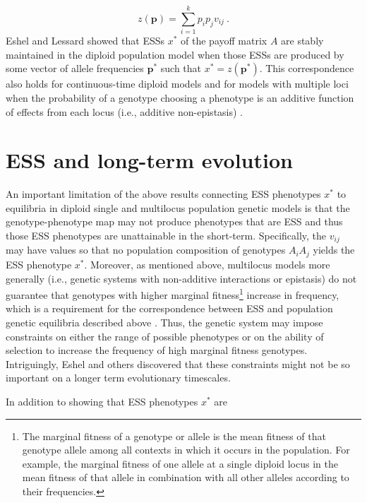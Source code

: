 \documentclass[11pt]{article}
\newcommand{\ess}[1]{#1^*}
\renewcommand{\vec}[1]{\mathbf{#1}}
\begin{document}
\begin{equation*}
  z(\vec{p}) = \sum_{i=1}^{k} p_{i} p_{j} v_{ij} \: .
\end{equation*}
Eshel and Lessard showed \cite{Eshel:1982,Lessard:1984} that ESSs $\ess{x}$ of the payoff matrix $A$ are stably maintained in the diploid population model when those ESSs are produced by some vector of allele frequencies $\ess{\vec{p}}$ such that $\ess{x} = z(\ess{\vec{p}})$. This correspondence also holds for continuous-time diploid models \cite{Sigmund:1987,Cressman:1988,Cressman:Hofbauer:1996,Hofbauer:Sigmund:1998} and for models with multiple loci when the probability of a genotype choosing a phenotype is an additive function of effects from each locus (i.e., additive non-epistasis) \cite{Eshel:1982}.

\section{ESS and long-term evolution}

An important limitation of the above results connecting ESS phenotypes $\ess{x}$ to equilibria in diploid single and multilocus population genetic models is that the genotype-phenotype map may not produce phenotypes that are ESS and thus those ESS phenotypes are unattainable in the short-term. Specifically, the $v_{ij}$ may have values so that no population composition of genotypes $A_{i} A_{j}$ yields the ESS phenotype $\ess{x}$. Moreover, as mentioned above, multilocus models more generally (i.e., genetic systems with non-additive interactions or epistasis) do not guarantee that genotypes with higher marginal fitness\footnote{The marginal fitness of a genotype or allele is the mean fitness of that genotype allele among all contexts in which it occurs in the population. For example, the marginal fitness of one allele at a single diploid locus in the mean fitness of that allele in combination with all other alleles according to their frequencies.} increase in frequency, which is a requirement for the correspondence between ESS and population genetic equilibria described above \cite{Eshel:1982,Hofbauer:Sigmund:1998}. Thus, the genetic system may impose constraints on either the range of possible phenotypes or on the ability of selection to increase the frequency of high marginal fitness genotypes. Intriguingly, Eshel and others discovered that these constraints might not be so important on a longer term evolutionary timescales.

In addition to showing that ESS phenotypes $\ess{x}$ are
\end{document}
